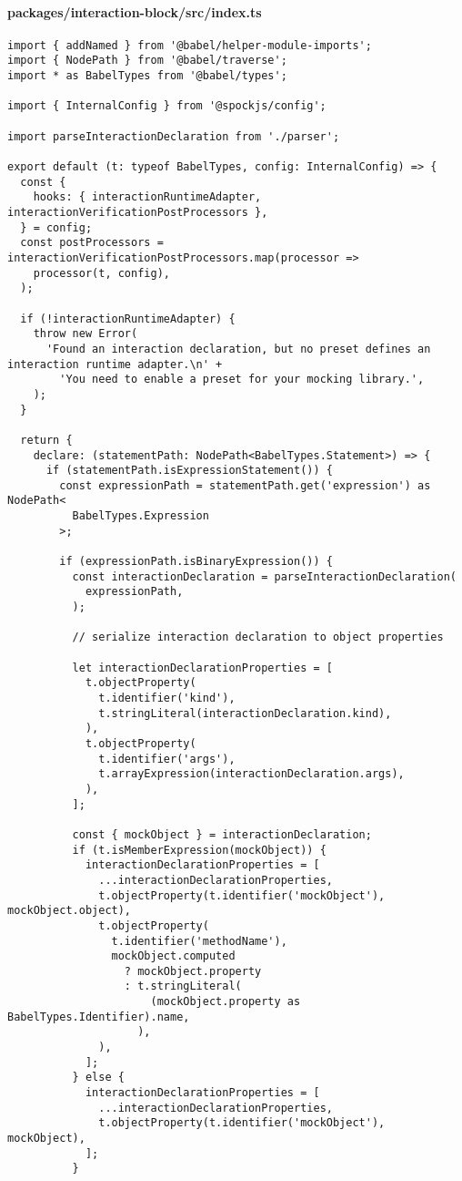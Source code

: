 \paragraph*{packages/interaction-block/src/index.ts}
\begin{verbatim}
import { addNamed } from '@babel/helper-module-imports';
import { NodePath } from '@babel/traverse';
import * as BabelTypes from '@babel/types';

import { InternalConfig } from '@spockjs/config';

import parseInteractionDeclaration from './parser';

export default (t: typeof BabelTypes, config: InternalConfig) => {
  const {
    hooks: { interactionRuntimeAdapter, interactionVerificationPostProcessors },
  } = config;
  const postProcessors = interactionVerificationPostProcessors.map(processor =>
    processor(t, config),
  );

  if (!interactionRuntimeAdapter) {
    throw new Error(
      'Found an interaction declaration, but no preset defines an interaction runtime adapter.\n' +
        'You need to enable a preset for your mocking library.',
    );
  }

  return {
    declare: (statementPath: NodePath<BabelTypes.Statement>) => {
      if (statementPath.isExpressionStatement()) {
        const expressionPath = statementPath.get('expression') as NodePath<
          BabelTypes.Expression
        >;

        if (expressionPath.isBinaryExpression()) {
          const interactionDeclaration = parseInteractionDeclaration(
            expressionPath,
          );

          // serialize interaction declaration to object properties

          let interactionDeclarationProperties = [
            t.objectProperty(
              t.identifier('kind'),
              t.stringLiteral(interactionDeclaration.kind),
            ),
            t.objectProperty(
              t.identifier('args'),
              t.arrayExpression(interactionDeclaration.args),
            ),
          ];

          const { mockObject } = interactionDeclaration;
          if (t.isMemberExpression(mockObject)) {
            interactionDeclarationProperties = [
              ...interactionDeclarationProperties,
              t.objectProperty(t.identifier('mockObject'), mockObject.object),
              t.objectProperty(
                t.identifier('methodName'),
                mockObject.computed
                  ? mockObject.property
                  : t.stringLiteral(
                      (mockObject.property as BabelTypes.Identifier).name,
                    ),
              ),
            ];
          } else {
            interactionDeclarationProperties = [
              ...interactionDeclarationProperties,
              t.objectProperty(t.identifier('mockObject'), mockObject),
            ];
          }


\end{verbatim}
